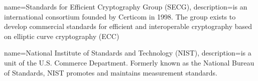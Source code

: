 


{
	name=Standards for Efficient Cryptography Group (SECG),
	description={is an international consortium founded by Certicom in 1998. The group exists to develop commercial standards for efficient and interoperable cryptography based on elliptic curve cryptography (ECC)}
}

{
	name=National Institute of Standards and Technology (NIST),
	description={is a unit of the U.S. Commerce Department. Formerly known as the National Bureau of Standards, NIST promotes and maintains measurement standards.}
}





